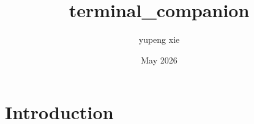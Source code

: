 \documentclass{article}
\title{terminal_companion}
\author{yupeng xie}
\date{May 2026}
\begin{document}
\maketitle

\section{Introduction}
\end{document}
